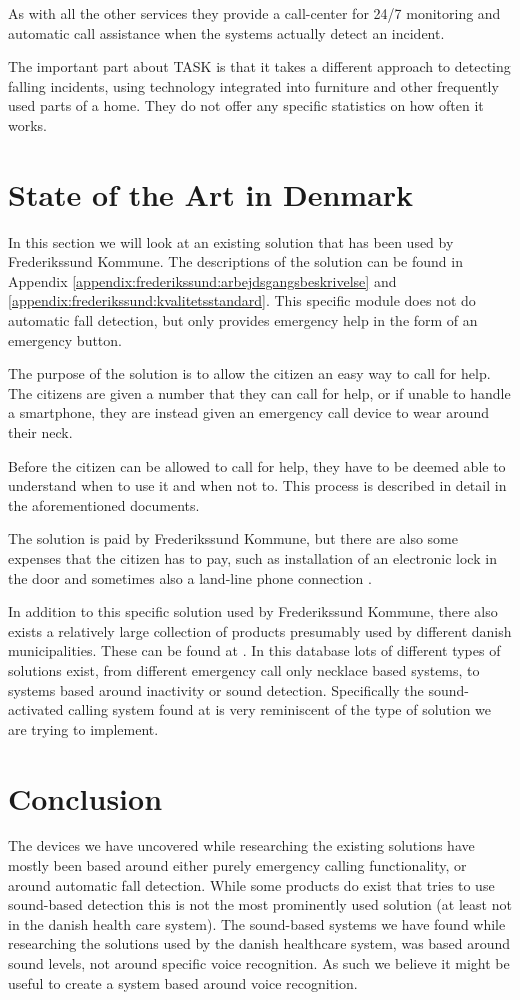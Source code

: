 As with all the other services they provide a call-center for 24/7 monitoring and automatic call assistance when the systems actually detect an incident.

The important part about TASK is that it takes a different approach to detecting falling incidents, using technology integrated into furniture and other frequently used parts of a home. They do not offer any specific statistics on how often it works. 

\section{State of the Art in Denmark}
In this section we will look at an existing solution that has been used by Frederikssund Kommune. The descriptions of the solution can be found in Appendix \ref{appendix:frederikssund:arbejdsgangsbeskrivelse} and \ref{appendix:frederikssund:kvalitetsstandard}. This specific module does not do automatic fall detection, but only provides emergency help in the form of an emergency button.

The purpose of the solution is to allow the citizen an easy way to call for help. The citizens are given a number that they can call for help, or if unable to handle a smartphone, they are instead given an emergency call device to wear around their neck.

Before the citizen can be allowed to call for help, they have to be deemed able to understand when to use it and when not to. This process is described in detail in the aforementioned documents.

The solution is paid by Frederikssund Kommune, but there are also some expenses that the citizen has to pay, such as installation of an electronic lock in the door and sometimes also a land-line phone connection \cite{frederikssund:arbejdesbeskrivelse} \cite{frederikssund:kvalitetsstandard}.

In addition to this specific solution used by Frederikssund Kommune, there also exists a relatively large collection of products presumably used by different danish municipalities.
These can be found at \cite{hmi}. In this database lots of different types of solutions exist, from different emergency call only necklace based systems, to systems based around inactivity or sound detection. Specifically the sound-activated calling system found at \cite{hmilak} is very reminiscent of the type of solution we are trying to implement.

\section{Conclusion}
The devices we have uncovered while researching the existing solutions have mostly been based around either purely emergency calling functionality, or around automatic fall detection. While some products do exist that tries to use sound-based detection this is not the most prominently used solution (at least not in the danish health care system). The sound-based systems we have found while researching the solutions used by the danish healthcare system, was based around sound levels, not around specific voice recognition. As such we believe it might be useful to create a system based around voice recognition.

